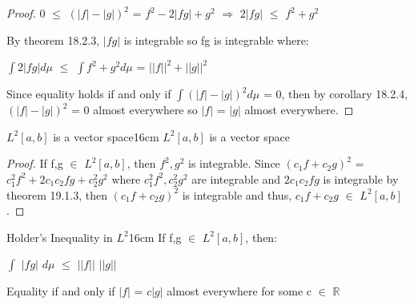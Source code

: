     \begin{proof}
        0 $\leq$ $(|f| - |g|)^2$
        = $f^2 - 2|fg| + g^2$
        \hspace{0.5cm}
        $\Rightarrow$
        \hspace{0.5cm}
        $2|fg|$ $\leq$ $f^2 + g^2$

        By {\color{red} theorem 18.2.3}, $|fg|$ is integrable so fg is integrable
        where:
        
        \hspace{0.5cm}
        $\int 2|fg| d\mu$
        $\leq$ $\int f^2 + g^2 d\mu$
        = $||f||^2 + ||g||^2$

        Since equality holds if and only if $\int (|f| - |g|)^2 d\mu$ = 0,
        then by {\color{orange} corollary 18.2.4}, $(|f| - |g|)^2$ = 0
        almost everywhere so $|f|$ = $|g|$ almost everywhere.
    \end{proof}

    \vspace{0.5cm}



    \begin{wtheorem}{$L^2[a,b]$ is a vector space}{16cm}
        $L^2[a,b]$ is a vector space
    \end{wtheorem}

    \begin{proof}
        If f,g $\in$ $L^2[a,b]$, then $f^2,g^2$ is integrable.
        Since $(c_1f+c_2g)^2$ = $c_1^2f^2 + 2c_1c_2fg + c_2^2g^2$
        where $c_1^2f^2,c_2^2g^2$ are integrable and $2c_1c_2fg$
        is integrable by {\color{red} theorem 19.1.3}, then
        $(c_1f+c_2g)^2$ is integrable and thus,
        $c_1f+c_2g$ $\in$ $L^2[a,b]$.
    \end{proof}

    \vspace{0.5cm}



    \begin{wtheorem}{Holder's Inequality in $L^2$}{16cm}
        If f,g $\in$ $L^2[a,b]$, then:

        \hspace{0.5cm}
        $\int$ $|fg|$ $d\mu$ $\leq$ $||f||$ $||g||$

        Equality if and only if
        $|f|$ = $c|g|$ almost everywhere for some c $\in$ $\mathbb{R}$
    \end{wtheorem}

